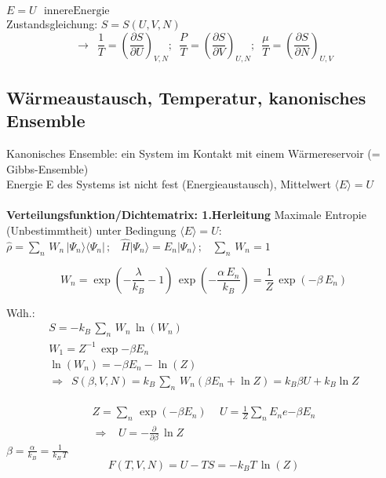 \documentclass[a4paper,11pt]{scrartcl}
\begin{document}
$E = U \,\,\,\, \mathrm{innere Energie}$\\
Zustandsgleichung: $S = S(U,V,N)$\\
\begin{equation}
 \rightarrow \,\,\, \frac{1}{T} = \left( \frac{\partial S}{ \partial U } \right)_{V,N}; \,\,\, \frac{P}{T} = \left( \frac{\partial S}{ \partial V } \right)_{U,N}; \,\,\, \frac{\mu}{T} = \left( \frac{\partial S}{ \partial N } \right)_{U,V}
\end{equation}

\subsection{Wärmeaustausch, Temperatur, kanonisches Ensemble}
Kanonisches Ensemble: ein System im Kontakt mit einem Wärmereservoir (= Gibbs-Ensemble)\\
Energie E des Systems ist nicht fest (Energieaustausch), Mittelwert $ \langle E \rangle = U$\\
\\
\textbf{Verteilungsfunktion/Dichtematrix: 1.Herleitung}
Maximale Entropie (Unbestimmtheit) unter Bedingung $\langle E \rangle = U$:\\
$\hat{\rho} = \sum_n \, W_n \, | \Psi_n \rangle \langle \Psi_n |\,; \,\,\,\,\, \hat{H}|\Psi_n \rangle = E_n | \Psi_n \rangle \, ; \,\,\,\,\, \sum_n \, W_n = 1$

\begin{equation}
 W_n = \exp(-\frac{\lambda}{k_B}-1)\, \exp(-\frac{\alpha \,E_n}{k_B}) = \frac{1}{Z} \, \exp(-\beta \, E_n)
\end{equation}

Wdh.: 
\begin{align}
 S = -k_B \, \sum_n \, W_n \, \ln(W_n)\\
 W_1 = Z^{-1}\, \exp{-\beta E_n}\\
 \ln(W_n)= -\beta E_n-\ln(Z)\\
 \Rightarrow \,\,\, S(\beta,V,N) = k_B \, \sum_n \, W_n (\beta E_n+ \ln Z) = k_B \beta U + k_B \ln Z 
\end{align}

\begin{align}
 Z = \sum_n \, \exp(-\beta E_n)\,\,\,\,\,\,\, U = \frac{1}{Z} \sum_n E_n e{-\beta E_n}\\
 \Rightarrow \,\,\,\,\, U = - \frac{\partial}{\partial \beta} \, \ln Z
\end{align}
$\beta = \frac{\alpha}{k_B} = \frac{1}{k_B\, T}$\\
\begin{equation}
 F(T,V,N)= U-TS= -k_B T \, \ln(Z)
\end{equation}
\end{document}
